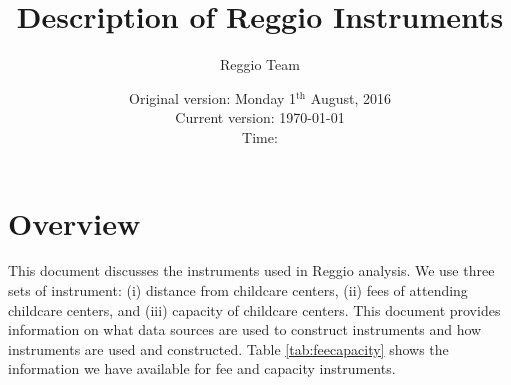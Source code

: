 




\title{Description of Reggio Instruments}
\author{Reggio Team}
\date{Original version: Monday 1$^{\text{th}}$ August, 2016 \\ Current version: \today \\ \vspace{1em} Time: \currenttime}
\maketitle

\tableofcontents

\doublespace

\section{Overview}
This document discusses the instruments used in Reggio analysis. We use three sets of instrument: (i) distance from childcare centers, (ii) fees of attending childcare centers, and (iii) capacity of childcare centers. This document provides information on what data sources are used to construct instruments and how instruments are used and constructed. Table \ref{tab:feecapacity} shows the information we have available for fee and capacity instruments. 


